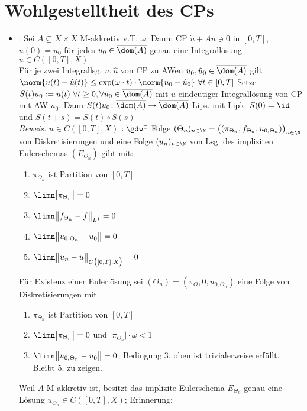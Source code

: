 	\section{Wohlgestelltheit des CPs}
	\begin{itemize}
		\item {}: Sei $A\subseteq X\times X$ M-akkretiv v.T. $\omega$.
		Dann: CP $\dot{u}+Au\ni 0$ in $[0,T]$, $u(0)=u_0$ für jedes $u_0\in\overline{\dom(A)}$ genau eine Integrallösung $u\in C([0,T],X)$\\
		Für je zwei Integrallsg. $u,\hat{u}$ von CP zu AWen $u_0,\hat{u}_0\in\overline{\dom(A)}$ gilt
		$\norm{u(t)-\hat{u}(t)}\leq\exp(\omega\cdot t)\cdot\norm{u_0-\hat{u}_0}~\forall t\in[0,T]$
		Setze $S(t)u_0:=u(t)~\forall t\geq0,\forall u_0\in\overline{\dom(A)}$ mit $u$ eindeutiger Integrallösung von CP mit AW $u_0$.
		Dann $S(t)u_0\colon\overline{\dom(A)}\to\overline{\dom(A)}$ Lips. mit Lipk. $S(0)=\id$ und $S(t+s)=S(t)\circ S(s)$\\
		\textit{Beweis.}
		$u\in C([0,T],X)$  $:\gdw\exists$ Folge $(\Theta_n)_{n\in\N}=\big((\pi_{\Theta_n},f_{\Theta_n},u_{0,\Theta_n})\big)_{n\in\N}$ von Diskretisierungen und eine Folge $(u_n)_{n\in\N}$ von Lsg. des impliziten Eulerschemas $(E_{\Theta_n})$ gibt mit:
		\begin{enumerate}
			\item $\pi_{\Theta_n}$ ist Partition von $[0,T]$
			\item $\limn\big|\pi_{\Theta_n}\big|=0$
			\item $\limn\big\Vert f_{\Theta_n}-f\big\Vert_{L^1}=0$
			\item $\limn\big\Vert u_{0,\Theta_n}-u_0\big\Vert=0$
			\item $\limn\big\Vert u_n-u\big\Vert_{C\big([0,T],X\big)}=0$
		\end{enumerate}	
		Für Existenz einer Eulerlösung sei $(\Theta_n)=(\pi_\Theta,0,u_{0,\Theta_n})$ eine Folge von Diskretisierungen mit 
		\begin{enumerate}
			\item $\pi_{\Theta_n}$ ist Partition von $[0,T]$
			\item $\limn\big|\pi_{\Theta_n}\big|=0$ und $\big|\pi_{\Theta_n}\big|\cdot\omega<1$
			\item $\limn\big\Vert u_{0,\Theta_n}-u_0\big\Vert=0$; Bedingung 3. oben ist trivialerweise erfüllt. Bleibt 5. zu zeigen.
		\end{enumerate}	
		Weil $A$ M-akkretiv ist, besitzt das implizite Eulerschema $E_{\Theta_n}$ genau eine Lösung $u_{\Theta_n}\in C([0,T],X)$; Erinnerung:

\end{itemize}
